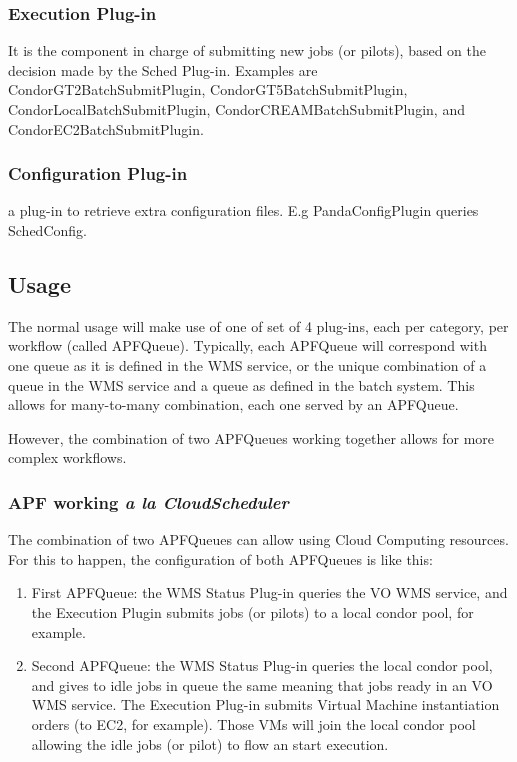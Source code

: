 \documentclass[a4paper]{jpconf}
\begin{document}
\subsubsection{Execution Plug-in} 
It is the component in charge of submitting new jobs (or pilots), 
based on the decision made by the Sched Plug-in. 
Examples are CondorGT2BatchSubmitPlugin, CondorGT5BatchSubmitPlugin, CondorLocalBatchSubmitPlugin, CondorCREAMBatchSubmitPlugin, and CondorEC2BatchSubmitPlugin.

\subsubsection{Configuration Plug-in} 
a plug-in to retrieve extra configuration files. 
E.g PandaConfigPlugin queries SchedConfig. 

\subsection{Usage}

The normal usage will make use of one of set of 4 plug-ins, each per category, per workflow (called APFQueue). 
Typically, each APFQueue will correspond with one queue as it is defined in the WMS service, 
or the unique combination of a queue in the WMS service and a queue as defined in the batch system. 
This allows for many-to-many combination, each one served by an APFQueue. 

However, the combination of two APFQueues working together allows for more complex workflows.

\subsubsection{APF working \emph{a la CloudScheduler}}

The combination of two APFQueues can allow using Cloud Computing resources. 
For this to happen, the configuration of both APFQueues is like this:

\begin{enumerate}
\item First APFQueue: 
the WMS Status Plug-in queries the VO WMS service, and the Execution Plugin submits jobs (or pilots) to a local condor pool, for example.
\item Second APFQueue: 
the WMS Status Plug-in queries the local condor pool, 
and gives to idle jobs in queue the same meaning that jobs ready in an VO WMS service. 
The Execution Plug-in submits Virtual Machine instantiation orders (to EC2, for example). 
Those VMs will join the local condor pool allowing the idle jobs (or pilot) to flow an start execution. 
\end{enumerate}
\end{document}
